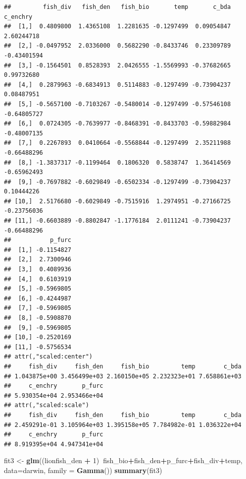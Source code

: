 \documentclass[]{article}
\newenvironment{Shaded}{\begin{snugshade}}{\end{snugshade}}
\newcommand{\KeywordTok}[1]{\textcolor[rgb]{0.13,0.29,0.53}{\textbf{#1}}}
\newcommand{\DataTypeTok}[1]{\textcolor[rgb]{0.13,0.29,0.53}{#1}}
\newcommand{\DecValTok}[1]{\textcolor[rgb]{0.00,0.00,0.81}{#1}}
\newcommand{\StringTok}[1]{\textcolor[rgb]{0.31,0.60,0.02}{#1}}
\newcommand{\OperatorTok}[1]{\textcolor[rgb]{0.81,0.36,0.00}{\textbf{#1}}}
\newcommand{\NormalTok}[1]{#1}
\begin{document}
\begin{verbatim}
##         fish_div   fish_den   fish_bio       temp       c_bda    c_enchry
##  [1,]  0.4809800  1.4365108  1.2281635 -0.1297499  0.09054847  2.60244718
##  [2,] -0.0497952  2.0336000  0.5682290 -0.8433746  0.23309789 -0.43401594
##  [3,] -0.1564501  0.8528393  2.0426555 -1.5569993 -0.37682665  0.99732680
##  [4,]  0.2879963 -0.6834913  0.5114883 -0.1297499 -0.73904237  0.08487951
##  [5,] -0.5657100 -0.7103267 -0.5480014 -0.1297499 -0.57546108 -0.64805727
##  [6,]  0.0724305 -0.7639977 -0.8468391 -0.8433703 -0.59882984 -0.48007135
##  [7,]  0.2267893  0.0410664 -0.5568844 -0.1297499  2.35211988 -0.66488296
##  [8,] -1.3837317 -0.1199464  0.1806320  0.5838747  1.36414569 -0.65962493
##  [9,] -0.7697882 -0.6029849 -0.6502334 -0.1297499 -0.73904237  0.10444226
## [10,]  2.5176680 -0.6029849 -0.7515916  1.2974951 -0.27166725 -0.23756036
## [11,] -0.6603889 -0.8802847 -1.1776184  2.0111241 -0.73904237 -0.66488296
##           p_furc
##  [1,] -0.1154827
##  [2,]  2.7300946
##  [3,]  0.4089936
##  [4,]  0.6103919
##  [5,] -0.5969805
##  [6,] -0.4244987
##  [7,] -0.5969805
##  [8,] -0.5908870
##  [9,] -0.5969805
## [10,] -0.2520169
## [11,] -0.5756534
## attr(,"scaled:center")
##     fish_div     fish_den     fish_bio         temp        c_bda 
## 1.043875e+00 3.456499e+03 2.160150e+05 2.232323e+01 7.658861e+03 
##     c_enchry       p_furc 
## 5.930354e+04 2.953466e+04 
## attr(,"scaled:scale")
##     fish_div     fish_den     fish_bio         temp        c_bda 
## 2.459291e-01 3.105964e+03 1.395158e+05 7.784982e-01 1.036322e+04 
##     c_enchry       p_furc 
## 8.919395e+04 4.947341e+04
\end{verbatim}

\begin{Shaded}
\begin{Highlighting}[]
\NormalTok{fit3 <-}\StringTok{ }\KeywordTok{glm}\NormalTok{((lionfish_den }\OperatorTok{+}\StringTok{ }\DecValTok{1}\NormalTok{)}\OperatorTok{~}\NormalTok{fish_bio}\OperatorTok{+}\NormalTok{fish_den}\OperatorTok{+}\NormalTok{p_furc}\OperatorTok{+}\NormalTok{fish_div}\OperatorTok{+}\NormalTok{temp, }\DataTypeTok{data=}\NormalTok{darwin, }\DataTypeTok{family =} \KeywordTok{Gamma}\NormalTok{())}
\KeywordTok{summary}\NormalTok{(fit3)}
\end{Highlighting}
\end{Shaded}
\end{document}
